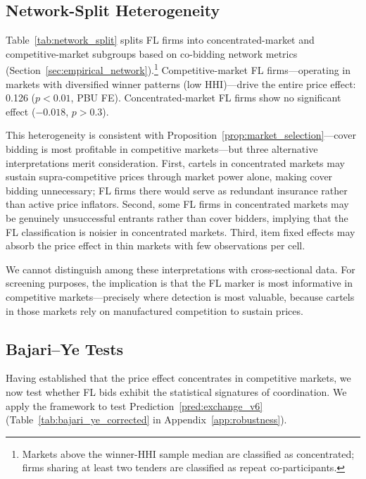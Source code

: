 \subsection{Network-Split Heterogeneity}
\label{sec:results_network}

Table~\ref{tab:network_split} splits FL firms into
concentrated-market and competitive-market subgroups based on
co-bidding network metrics (Section~\ref{sec:empirical_network}).\footnote{Markets
above the winner-HHI sample median are classified as concentrated;
firms sharing at least two tenders are classified as repeat
co-participants.}
Competitive-market FL firms---operating in markets with diversified
winner patterns (low HHI)---drive the entire price effect: 0.126
($p < 0.01$, PBU FE). Concentrated-market FL firms show no significant
effect ($-0.018$, $p > 0.3$).

This heterogeneity is consistent with Proposition~\ref{prop:market_selection}---cover bidding is most profitable in
competitive markets---but three alternative interpretations merit
consideration. First, cartels in concentrated markets may sustain
supra-competitive prices through market power alone, making cover
bidding unnecessary; FL firms there would serve as redundant insurance
rather than active price inflators. Second, some FL firms in
concentrated markets may be genuinely unsuccessful entrants rather than
cover bidders, implying that the FL classification is noisier in
concentrated markets. Third, item fixed effects may absorb the price
effect in thin markets with few observations per cell.

We cannot distinguish among these interpretations with cross-sectional
data. For screening purposes, the implication is that the FL marker is
most informative in competitive markets---precisely where detection is
most valuable, because cartels in those markets rely on manufactured
competition to sustain prices.



\subsection{Bajari--Ye Tests}
\label{sec:results_bajari}

Having established that the price effect concentrates in competitive
markets, we now test whether FL bids exhibit the statistical
signatures of coordination. We apply the \citet{bajari2003deciding}
framework to test
Prediction~\ref{pred:exchange_v6}
(Table~\ref{tab:bajari_ye_corrected} in Appendix~\ref{app:robustness}).

